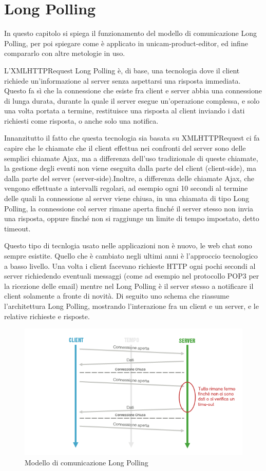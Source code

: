 \chapter{Long Polling}
\label{chap:long_polling}
In questo capitolo si spiega il funzionamento del modello di comunicazione 
Long Polling, per poi spiegare come è applicato in unicam-product-editor, 
ed infine compararlo con altre metologie in uso.

L'XMLHTTPRequest Long Polling è, di base, una tecnologia dove il client 
richiede un'informazione al server senza aspettarsi una risposta immediata.
Questo fa sì che la connessione che esiste fra client e server abbia una 
connessione di lunga durata, durante la quale il server esegue un'operazione 
complessa, e solo una volta portata a termine, restituisce una risposta al 
client inviando i dati richiesti come risposta, o anche solo una notifica.

Innanzitutto il fatto che questa tecnologia sia basata su XMLHTTPRequest 
ci fa capire che le chiamate che il client effettua nei confronti del 
server sono delle semplici chiamate Ajax, ma a differenza dell'uso 
tradizionale di queste chiamate, la gestione degli eventi non viene 
eseguita dalla parte del client (client-side), ma dalla parte del 
server (server-side).Inoltre, a differenza delle chiamate Ajax, che 
vengono effettuate a intervalli regolari, ad esempio ogni 10 secondi 
al termine delle quali la connessione al server viene chiusa, in una 
chiamata di tipo Long Polling, la connessione col server rimane aperta 
finché il server stesso non invia una risposta, oppure finché non si 
raggiunge un limite di tempo impostato, detto timeout.

Questo tipo di tecnlogia usato nelle applicazioni non è nuovo, le web 
chat sono sempre esistite. Quello che è cambiato negli ultimi anni è 
l’approccio tecnologico a basso livello. Una volta i client facevano 
richieste HTTP ogni pochi secondi al server richiedendo eventuali 
messaggi (come ad esempio nel protocollo POP3 per la ricezione delle 
email) mentre nel Long Polling è il server stesso a notificare il 
client solamente a fronte di novità.
\newpage
Di seguito uno schema che riassume l'architettura Long Polling, 
mostrando l'interazione fra un client e un server, e le relative 
richieste e risposte.
\begin{figure}[h]
	\centering
	\includegraphics[scale=0.7]{Immagini/long_polling.png}
	\caption{Modello di comunicazione Long Polling}
\end{figure}

